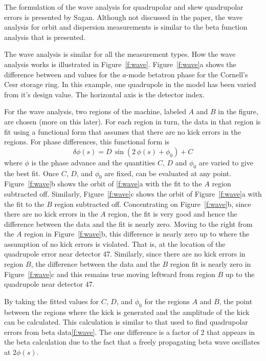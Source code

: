 The formulation of the wave analysis for quadrupolar and skew quadrupolar errors is presented by
Sagan\cite{b:wave}.  Although not discussed in the paper, the wave analysis for orbit and dispersion
measurements is similar to the beta function analysis that is presented.

The wave analysis is similar for all the measurement types. How the wave analysis works is
illustrated in Figure~\ref{f:wave}.  Figure~\ref{f:wave}a shows the difference between 
and  values for the $a$-mode betatron phase for the Cornell's Cesr storage ring. In this
example, one quadrupole in the model has been varied from it's design value. The horizontal axis is
the detector index.

For the wave analysis, two regions of the machine, labeled $A$ and $B$ in the figure, are chosen
(more on this later). For each region in turn, the data in that region is fit using a functional
form that assumes that there are no kick errors in the regions.  For phase differences, this
functional form is
\begin{equation}
  \delta \phi(s) = D \, \sin(2 \, \phi(s) + \phi_0) + C
  \label{xabps}
\end{equation}
where $\phi$ is the phase advance and the quantities $C$, $D$ and $\phi_0$ are varied to give the
best fit.  Once $C$, $D$, and $\phi_0$ are fixed,  can be evaluated at any
point. Figure~\ref{f:wave}b shows the orbit of \ref{f:wave}a with the fit to the $A$ region
subtracted off. Similarly, Figure~\ref{f:wave}c shows the orbit of Figure~\ref{f:wave}a with the fit
to the $B$ region subtracted off. Concentrating on Figure~\ref{f:wave}b, since there are no kick
errors in the $A$ region, the fit is very good and hence the difference between the data and the fit
is nearly zero. Moving to the right from the $A$ region in Figure~\ref{f:wave}b, this difference is
nearly zero up to where the assumption of no kick errors is violated. That is, at the location of
the quadrupole error near detector 47. Similarly, since there are no kick errors in region $B$, the
difference between the data and the $B$ region fit is nearly zero in Figure~\ref{f:wave}c and this
remains true moving leftward from region $B$ up to the quadrupole near detector 47.

By taking the fitted values for $C$, $D$, and $\phi_0$ for the regions $A$ and $B$, the point
between the regions where the kick is generated and the amplitude of the kick can be
calculated. This calculation is similar to that used to find quadrupolar errors from beta
data\ref{f:wave}. The one difference is a factor of 2 that appears in the beta calculation due to
the fact that a freely propagating beta wave oscillates at $2\phi(s)$.

